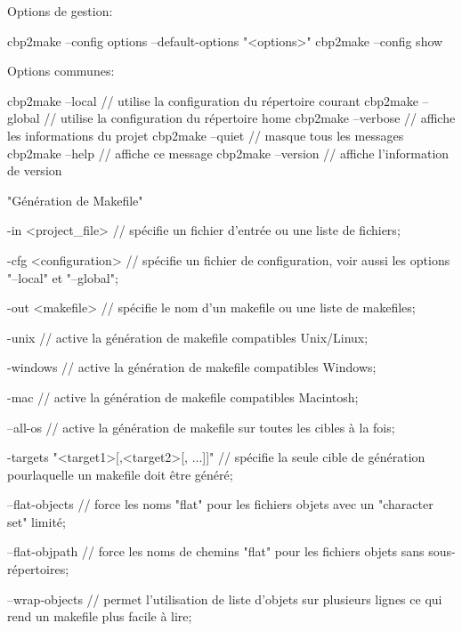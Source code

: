 Options de gestion:
\begin{code}
cbp2make --config options --default-options "<options>"    
cbp2make --config show
\end{code}

Options communes:
\begin{code}
cbp2make --local         // utilise la configuration du répertoire courant
cbp2make --global        // utilise la configuration du répertoire home
cbp2make --verbose       // affiche les informations du projet
cbp2make --quiet         // masque tous les messages
cbp2make --help          // affiche ce message
cbp2make --version       // affiche l'information de version
\end{code}


\begin{code}
"Génération de Makefile"

    -in <project_file>   // spécifie un fichier d'entrée ou une liste de fichiers;

    -cfg <configuration> // spécifie un fichier de configuration, voir aussi les
                            options "--local" et "--global";

    -out <makefile>      // spécifie le nom d'un makefile ou une liste de
                            makefiles;

    -unix                // active la génération de makefile compatibles Unix/Linux;

    -windows             // active la génération de makefile compatibles Windows;

    -mac                 // active la génération de makefile compatibles Macintosh;

    --all-os             // active la génération de makefile sur toutes les cibles
                            à la fois;

    -targets "<target1>[,<target2>[, ...]]" // spécifie la seule cible de génération 
                                               pourlaquelle un makefile doit être 
                                               généré;

    --flat-objects       // force les noms "flat" pour les fichiers objets avec un
                            "character set" limité;

    --flat-objpath       // force les noms de chemins "flat" pour les fichiers objets
                            sans sous-répertoires;

    --wrap-objects       // permet l'utilisation de liste d'objets sur plusieurs 
                            lignes ce qui rend un makefile plus facile à lire;


\end{code}
